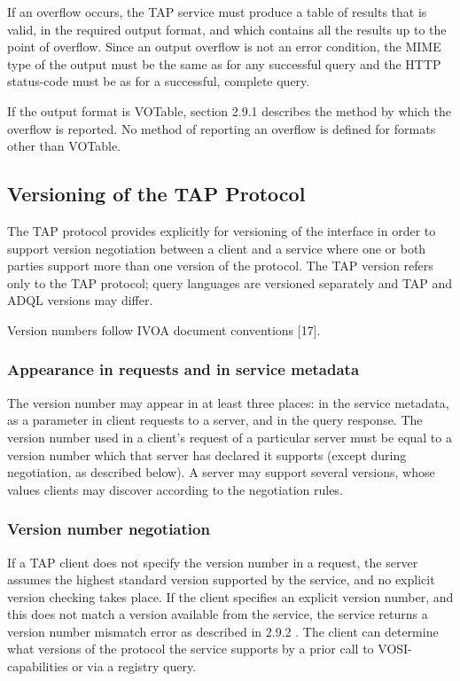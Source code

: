 \documentclass[11pt,a4paper]{ivoa}
\begin{document}
If an overflow occurs, the TAP service must produce a table of results that is 
valid, in the required output format, and which contains all the results up to 
the point of overflow. Since an output overflow is not an error condition, the 
MIME type of the output must be the same as for any successful query and the 
HTTP status-code must be as for a successful, complete query.

If the output format is VOTable, section 2.9.1 describes the method by which the 
overflow is reported. No method of reporting an overflow is defined for formats 
other than VOTable.

\subsection{Versioning of the TAP Protocol}
The TAP protocol provides explicitly for versioning of the interface in order to 
support version negotiation between a client and a service where one or both 
parties support more than one version of the protocol. The TAP version refers 
only to the TAP protocol; query languages are versioned separately and TAP and 
ADQL versions may differ.

Version numbers follow IVOA document conventions [17].

\subsubsection{Appearance in requests and in service metadata}
The version number may appear in at least three places: in the service metadata, 
as a parameter in client requests to a server, and in the query response. The 
version number used in a client’s request of a particular server must be equal 
to a version number which that server has declared it supports (except during 
negotiation, as described below). A server may support several versions, whose 
values clients may discover according to the negotiation rules.

\subsubsection{Version number negotiation}
If a TAP client does not specify the version number in a request, the server 
assumes the highest standard version supported by the service, and no explicit 
version checking takes place.   If the client specifies an explicit version 
number, and this does not match a version available from the service, the 
service returns a version number mismatch error as described in 2.9.2 . The 
client can determine what versions of the protocol the service supports by a 
prior call to VOSI-capabilities or via a registry query.
\end{document}
